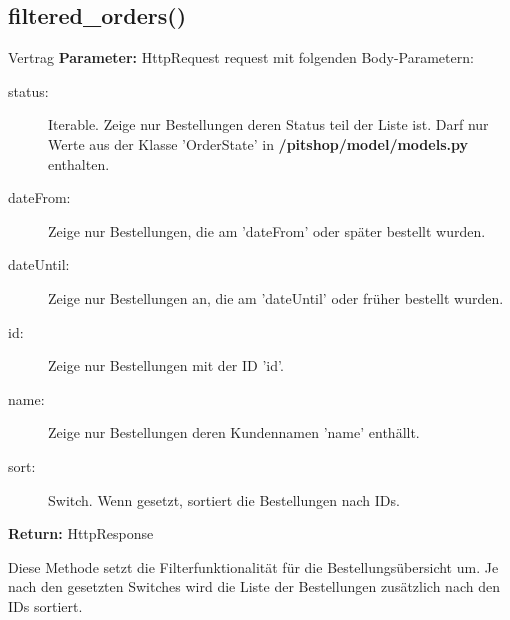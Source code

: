 \documentclass[12pt]{article}
\newcommand{\dir}[1]{\textbf{/#1}}
\newcommand{\insetContract}{12pt}
\newcommand{\insetMethodDescription}{-0.7cm}
\begin{document}
\subsection{filtered_orders()}
\begin{contract}{Vertrag}
    \textbf{Parameter:} HttpRequest request mit folgenden Body-Parametern:
    \begin{description}
        \item[\hspace{\insetContract} status:] Iterable. Zeige nur Bestellungen deren Status teil der Liste ist. Darf nur Werte aus der Klasse 'OrderState' in \dir{pitshop/model/models.py} enthalten.
        \item[\hspace{\insetContract} dateFrom:] Zeige nur Bestellungen, die am 'dateFrom' oder später bestellt wurden.
        \item[\hspace{\insetContract} dateUntil:] Zeige nur Bestellungen an, die am 'dateUntil' oder früher bestellt wurden.
        \item[\hspace{\insetContract} id:] Zeige nur Bestellungen mit der ID 'id'.
        \item[\hspace{\insetContract} name:] Zeige nur Bestellungen deren Kundennamen 'name' enthällt.
        \item[\hspace{\insetContract} sort:] Switch. Wenn gesetzt, sortiert die Bestellungen nach IDs.
    \end{description}
    \textbf{Return:} HttpResponse
\end{contract}
\hspace{\insetMethodDescription{}}
Diese Methode setzt die Filterfunktionalität für die Bestellungsübersicht um. Je nach den gesetzten Switches wird die Liste der Bestellungen zusätzlich nach den IDs sortiert.
\end{document}
